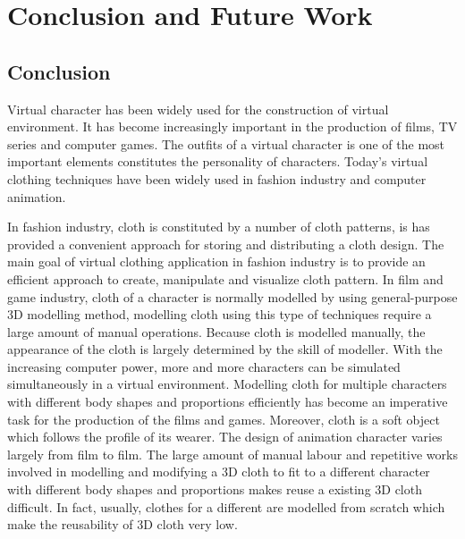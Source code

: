 
\ifx\isEmbedded\undefined

\graphicspath{{../images/}}

\fi


\chapter{Conclusion and Future Work}
\label{cha:conclusion}

\section{Conclusion}

Virtual character has been widely used for the construction of virtual environment. It has become increasingly important in the production of films, TV series and computer games. The outfits of a virtual character is one of the most important elements constitutes the personality of characters. Today's virtual clothing techniques have been widely used in fashion industry and computer animation. 

In fashion industry, cloth is constituted by a number of cloth patterns, is has provided a convenient approach for storing and distributing a cloth design. The main goal of virtual clothing application in fashion industry is to provide an efficient approach to create, manipulate and visualize cloth pattern. In film and game industry, cloth of a character is normally modelled by using general-purpose 3D modelling method, modelling cloth using this type of techniques require a large amount of manual operations. Because cloth is modelled manually, the appearance of the cloth is largely determined by the skill of modeller. With the increasing computer power, more and more characters can be simulated simultaneously in a virtual environment. Modelling cloth for multiple characters with different body shapes and proportions efficiently has become an imperative task for the production of the films and games. Moreover, cloth is a soft object which follows the profile of its wearer. The design of animation character varies largely from film to film. The large amount of manual labour and repetitive works involved in modelling and modifying a 3D cloth to fit to a different character with different body shapes and proportions makes reuse a existing 3D cloth difficult. In fact, usually, clothes for a different are modelled from scratch which make the reusability of 3D cloth very low.

